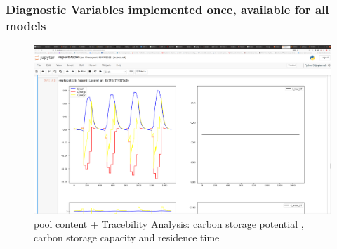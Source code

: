 \begin{frame}
	\frametitle{Diagnostic Variables implemented once, available for all models}
	\begin{figure}
	\includegraphics[width=\textwidth]{TracebilityAnalysis.png}
	\caption{pool content + Tracebility Analysis: carbon storage potential , carbon storage capacity and residence time}
	\end{figure}
\end{frame}

